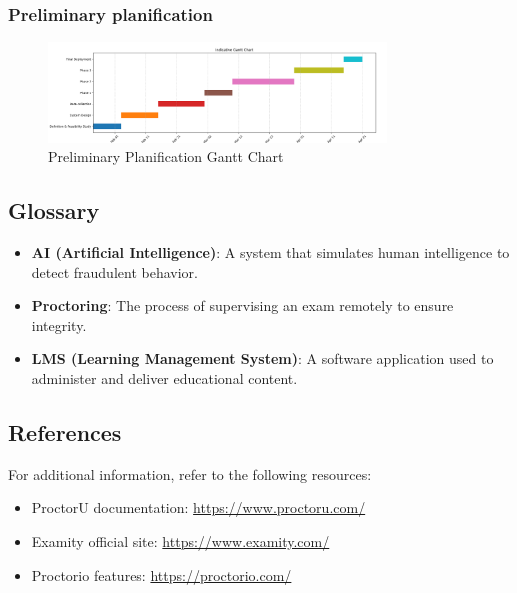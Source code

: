 \documentclass[12pt,a4paper]{article}
\begin{document}
\subsubsection{Preliminary planification}
\begin{figure}[H]
    \centering
    \includegraphics[width=0.8\textwidth]{gantt.png}
    \caption{Preliminary Planification Gantt Chart}
    \label{fig:gantt}
\end{figure}



\subsection{Glossary}
\begin{itemize}
    \item \textbf{AI (Artificial Intelligence)}: A system that simulates human intelligence to detect fraudulent behavior.
    \item \textbf{Proctoring}: The process of supervising an exam remotely to ensure integrity.
    \item \textbf{LMS (Learning Management System)}: A software application used to administer and deliver educational content.
\end{itemize}



\subsection{References}
For additional information, refer to the following resources:
\begin{itemize}
    \item ProctorU documentation: \url{https://www.proctoru.com/}
    \item Examity official site: \url{https://www.examity.com/}
    \item Proctorio features: \url{https://proctorio.com/}
\end{itemize}
\end{document}
